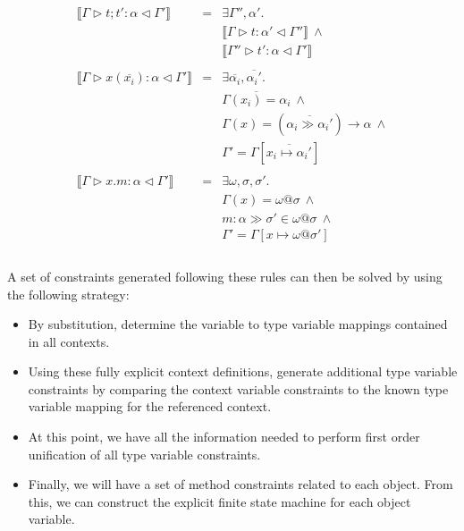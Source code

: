 \documentclass{article}
\newcommand{\inferrule}[4]{\llbracket #1 \triangleright #2 : #3 \triangleleft #4 \rrbracket}
\newcommand{\inferlhs}[1]{\llbracket \Gamma \triangleright #1 : \alpha \triangleleft \Gamma' \rrbracket}
\begin{document}
\[\begin{array}{lll}
\inferlhs{t ; t'}
& = &
\exists \Gamma'', \alpha' . 
\\ && 
\inferrule{\Gamma}{t}{\alpha'}{\Gamma''}\:\wedge
\\ && 
\inferrule{\Gamma''}{t'}{\alpha}{\Gamma'}
\\
\\

\inferlhs{x ( \overline{x_i} )}
& = &
\exists \overline{\alpha_i}, \overline{\alpha_i'} .
\\ && 
\overline{\Gamma(x_i) = \alpha_i}\:\wedge
\\ && 
\Gamma(x) = ( \overline{\alpha_i \gg \alpha_i'} ) \rightarrow \alpha\:\wedge
\\ && 
\Gamma' = \Gamma [ \overline{x_i \mapsto \alpha_i'} ]
\\
\\

\inferlhs{x.m}
& = &
\exists \omega, \sigma, \sigma' . 
\\ && 
\Gamma(x) = \omega @ \sigma\:\wedge
\\ && 
m : \alpha \gg \sigma' \in \omega @ \sigma\:\wedge
\\ && 
\Gamma' = \Gamma[ x \mapsto \omega @ \sigma' ]
\\
\\

\end{array}
\]

A set of constraints generated following these rules can then be solved by
using the following strategy:

\begin{itemize}
\item By substitution, determine the variable to type variable mappings
contained in all contexts.
\item Using these fully explicit context definitions, generate additional
type variable constraints by comparing the context variable constraints
to the known type variable mapping for the referenced context.
\item At this point, we have all the information needed to perform first
order unification of all type variable constraints.
\item Finally, we will have a set of method constraints related to each
object. From this, we can construct the explicit finite state machine
for each object variable.
\end{itemize}
\end{document}
